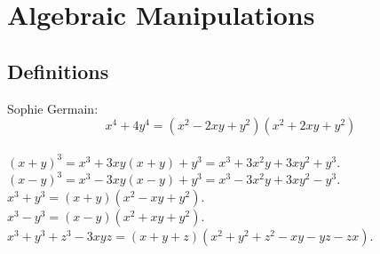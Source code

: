 \section{Algebraic Manipulations}
\subsection{Definitions}
Sophie Germain: \[x^4 + 4y^4 = (x^2-2xy+y^2)(x^2+2xy+y^2)\] \\
$(x+y)^3 = x^3+3xy(x+y)+y^3 = x^3+3x^2y+3xy^2+y^3$. \\
$(x-y)^3 = x^3-3xy(x-y)+y^3 = x^3-3x^2y+3xy^2-y^3$. \\
$x^3 + y^3 = (x+y)(x^2-xy+y^2)$. \\
$x^3 - y^3 = (x-y)(x^2+xy+y^2)$. \\
$x^3+y^3+z^3-3xyz = (x+y+z)(x^2+y^2+z^2−xy−yz−zx)$.

